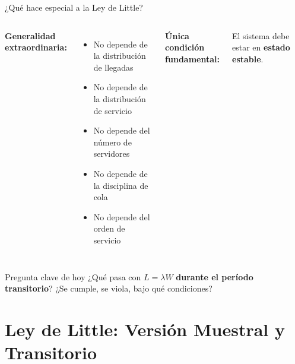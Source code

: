 \documentclass[aspectratio=1610, 9pt]{beamer}
\begin{document}
\begin{frame}{¿Qué hace especial a la Ley de Little?}

\begin{columns}
\textbf{Generalidad extraordinaria:}
\begin{itemize}
    \item No depende de la distribución de llegadas
    \item No depende de la distribución de servicio
    \item No depende del número de servidores
    \item No depende de la disciplina de cola
    \item No depende del orden de servicio
\end{itemize}

\vspace{0.3cm}
\textbf{Única condición fundamental:}

El sistema debe estar en \textcolor{rojoclaro}{\textbf{estado estable}}.

\begin{center}
\end{center}
\end{columns}

\vspace{0.3cm}
\begin{alertblock}{Pregunta clave de hoy}
¿Qué pasa con $L = \lambda W$ \textbf{durante el período transitorio}? ¿Se cumple, se viola, bajo qué condiciones?
\end{alertblock}
\end{frame}

\section{Ley de Little: Versión Muestral y Transitorio}
\end{document}
